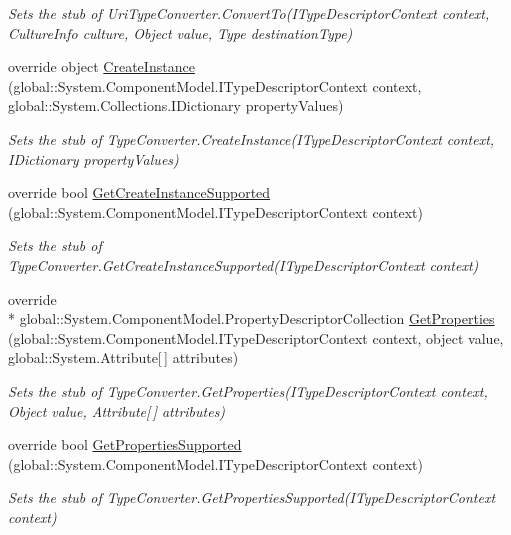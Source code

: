 \begin{DoxyCompactItemize}
\begin{DoxyCompactList}\small\item\em Sets the stub of Uri\-Type\-Converter.\-Convert\-To(\-I\-Type\-Descriptor\-Context context, Culture\-Info culture, Object value, Type destination\-Type)\end{DoxyCompactList}\item 
override object \hyperlink{class_system_1_1_fakes_1_1_stub_uri_type_converter_a2772786bbb5f38844d2cd31aad1370e3}{Create\-Instance} (global\-::\-System.\-Component\-Model.\-I\-Type\-Descriptor\-Context context, global\-::\-System.\-Collections.\-I\-Dictionary property\-Values)
\begin{DoxyCompactList}\small\item\em Sets the stub of Type\-Converter.\-Create\-Instance(\-I\-Type\-Descriptor\-Context context, I\-Dictionary property\-Values)\end{DoxyCompactList}\item 
override bool \hyperlink{class_system_1_1_fakes_1_1_stub_uri_type_converter_a7c2b6edc82992873230502bba0379e64}{Get\-Create\-Instance\-Supported} (global\-::\-System.\-Component\-Model.\-I\-Type\-Descriptor\-Context context)
\begin{DoxyCompactList}\small\item\em Sets the stub of Type\-Converter.\-Get\-Create\-Instance\-Supported(\-I\-Type\-Descriptor\-Context context)\end{DoxyCompactList}\item 
override \\*
global\-::\-System.\-Component\-Model.\-Property\-Descriptor\-Collection \hyperlink{class_system_1_1_fakes_1_1_stub_uri_type_converter_a14d88cd8ecf749a3f6f5fbec762d1883}{Get\-Properties} (global\-::\-System.\-Component\-Model.\-I\-Type\-Descriptor\-Context context, object value, global\-::\-System.\-Attribute\mbox{[}$\,$\mbox{]} attributes)
\begin{DoxyCompactList}\small\item\em Sets the stub of Type\-Converter.\-Get\-Properties(\-I\-Type\-Descriptor\-Context context, Object value, Attribute\mbox{[}$\,$\mbox{]} attributes)\end{DoxyCompactList}\item 
override bool \hyperlink{class_system_1_1_fakes_1_1_stub_uri_type_converter_aeca7426b321162b5bfc9f9a09b65ffc9}{Get\-Properties\-Supported} (global\-::\-System.\-Component\-Model.\-I\-Type\-Descriptor\-Context context)
\begin{DoxyCompactList}\small\item\em Sets the stub of Type\-Converter.\-Get\-Properties\-Supported(\-I\-Type\-Descriptor\-Context context)\end{DoxyCompactList}\item 

\end{DoxyCompactItemize}
